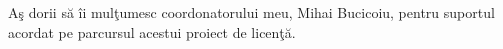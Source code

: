 \vspace*{7cm}
\begin{center}
A\c{s} dorii s\u{a} \^{i}i mul\c{t}umesc coordonatorului meu, Mihai Bucicoiu, pentru suportul acordat pe parcursul acestui proiect de licen\c{t}\u{a}.
\end{center}

